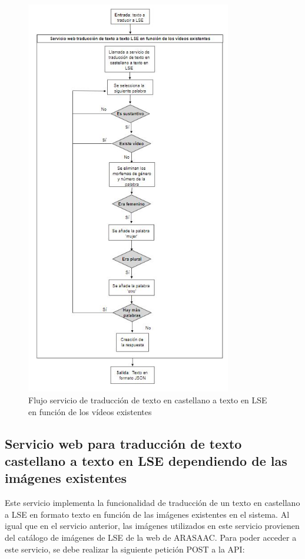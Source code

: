 \begin{figure}[]
	\centering
	\includegraphics[width=0.8\textwidth]{Imagenes/Fuentes/Text2LSE/FlujoTextoVideoTexto.jpg}
	\caption{ Flujo servicio de traducción de texto en castellano a texto en LSE en función de los vídeos existentes }
	\label {fig: imgFlujoTextoVideoTextoText2LSE}
\end{figure}

\subsection{Servicio web para traducción de texto castellano a texto en LSE dependiendo de las imágenes existentes}

Este servicio implementa la funcionalidad de traducción de un texto en castellano a LSE en formato texto en función de las imágenes existentes en el sistema. Al igual que en el servicio anterior, las imágenes utilizados en este servicio provienen del catálogo de imágenes de LSE de la web de ARASAAC. Para poder acceder a este servicio, se debe realizar la siguiente petición POST a la API:\\

